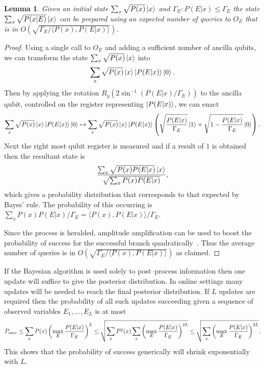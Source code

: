 \documentclass[aps,amsmath,onecolumn,amssymb]{revtex4}
\newtheorem{lemma}{Lemma}
\begin{document}
\begin{lemma}
Given an initial state $\sum_x \sqrt{P(x)} \left|x\right\rangle$ and $\Gamma_E : P(E|x) \le \Gamma_E$ the state $\sum_x \sqrt{P(x|E)} \left|x\right\rangle$ can be prepared using an expected number of queries to $O_E$ that is in $O(\sqrt{\Gamma_E/\langle P(x), P(E|x)\rangle})$.\label{lem:rejection}
\end{lemma}
\begin{proof}
Using a single call to $O_E$ and adding a sufficient number of ancilla qubits, we can transform the state $\sum_x \sqrt{P(x)} \left|x\right\rangle$ into
\begin{equation}
\sum_x \sqrt{P(x)} \left|x\right\rangle \left|P(E|x)\right\rangle\left|0\right\rangle.
\end{equation}
Then by applying the rotation $R_y(2 \sin^{-1}(P(E|x)/\Gamma_E))$ to the ancilla qubit, controlled on the register representing $\left|P(E|x)\right\rangle$, we can enact
\begin{equation}
\sum_x \sqrt{P(x)} \left|x\right\rangle \left|P(E|x)\right\rangle\left|0\right\rangle\mapsto \sum_x \sqrt{P(x)} \left|x\right\rangle \left|P(E|x)\right\rangle\left(\sqrt{\frac{P(E|x)}{\Gamma_E}}\left|1\right\rangle + \sqrt{1-\frac{P(E|x)}{\Gamma_E}}\left|0\right\rangle \right).\label{eq:rejection}
\end{equation}
Next the right most qubit register is measured and if a result of $1$ is obtained then the resultant state is
\begin{equation}
\frac{\sum_{x} \sqrt{P(x) P(E|x)}\left|x\right\rangle}{\sqrt{\sum_x P(x)P(E|x)}},
\end{equation}
which gives a probability distribution that corresponds to that expected by Bayes' rule.  The probability of this occurring is $\sum_x P(x) P(E|x) /\Gamma_E = \langle P(x), P(E|x) \rangle / \Gamma_E$.

Since the process is heralded, amplitude amplification can be used to boost the probability of success for the successful branch quadratically~\cite{BHM+02}.  Thus the average number of queries is in $O(\sqrt{\Gamma_E/\langle P(x), P(E|x)\rangle})$ as claimed.
\end{proof}
If the Bayesian algorithm is used solely to post--process information then one update will suffice to give the posterior distribution.  In online settings many updates will be needed to reach the final posterior distribution.  If $L$ updates are required then the probability of all such updates succeeding given a sequence of observed variables $E_1,\ldots,E_L$ is at most
\begin{equation}
P_{\rm succ} \le \sum_x P(x) \left(\max_E \frac{P(E|x)}{\Gamma_E}\right)^L\le \sqrt{\sum_x P^2(x)\sum_x \left(\max_E \frac{P(E|x)}{\Gamma_E}\right)^{2L}}\le\sqrt{\sum_x \left(\max_E \frac{P(E|x)}{\Gamma_E}\right)^{2L}}.
\end{equation}
This shows that the probability of success generically will shrink exponentially with $L$.
\end{document}

